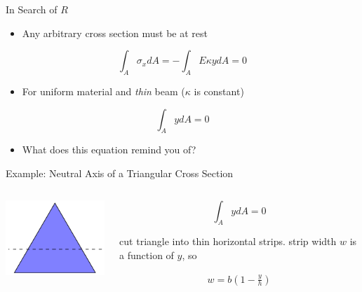 \documentclass[10pt, svgnames]{beamer}
\begin{document}
\begin{frame}[label={sec:orgcc58e0f}]{In Search of \(R\)}
\begin{itemize}
\item Any arbitrary cross section must be at rest
\end{itemize}

\[\int_A \sigma_x dA = - \int_A E \kappa y dA = 0\]

\begin{itemize}
\item For uniform material and \emph{thin} beam (\(\kappa\) is constant)
\end{itemize}

\[\int_A y dA = 0\]

\begin{itemize}
\item What does this equation remind you of?
\end{itemize}
\end{frame}

\begin{frame}[label={sec:org8990716}]{Example: Neutral Axis of a Triangular Cross Section}
\begin{columns}
\begin{column}{0.3\columnwidth}
\begin{center}
\includegraphics[width=\textwidth]{./pictures/triangular-section-axis.pdf}
\end{center}
\end{column}

\begin{column}{0.6\columnwidth}
\[\int_A y dA = 0\]

cut triangle into thin horizontal strips. strip
width \(w\) is a function of \(y\), so

\begin{align*}
        w = b \left( 1 - \frac{y}{h} \right)
\end{align*}
\end{column}
\end{columns}
\end{frame}
\end{document}
